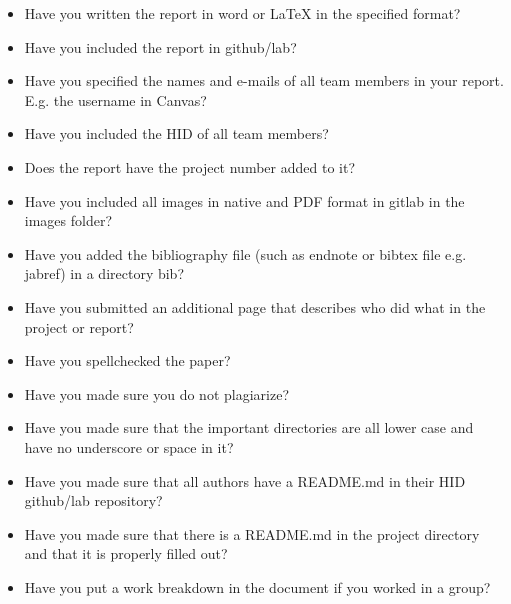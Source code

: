 \documentclass[9pt,twocolumn,twoside]{styles/osajnl}
\begin{document}
\begin{itemize}
\renewcommand{\labelitemi}{\scriptsize$\square$} 
\item Have you written the report in word or LaTeX in the specified
  format?
\item Have you included the report in github/lab?
\item Have you specified the names and e-mails of all team members in
  your report. E.g. the username in Canvas?
\item Have you included the HID of all team members?
\item Does the report have the project number added to it?
\item Have you included all images in native and PDF format in gitlab
  in the images folder?
\item Have you added the bibliography file (such as endnote or bibtex
  file e.g. jabref) in a directory bib?
\item Have you submitted an additional page that describes who did
  what in the project or report?
\item Have you spellchecked the paper?
\item Have you made sure you do not plagiarize?
\item Have you made sure that the important directories are all lower
  case and have no underscore or space in it?
\item Have you made sure that all authors have a README.md in their
  HID github/lab repository?
\item Have you made sure that there is a README.md in the project
  directory and that it is properly filled out?
\item Have you put a work breakdown in the document if you worked in a
  group?
\end{itemize}
\end{document}
